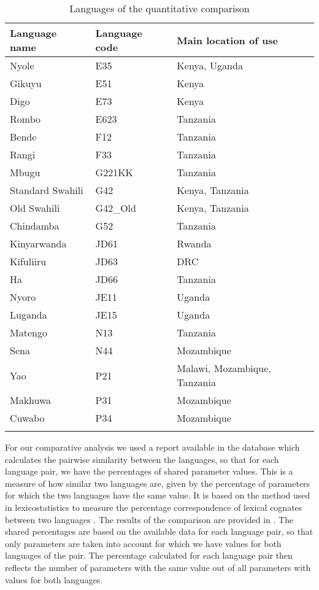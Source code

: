 \documentclass[output=paper]{langscibook}
\begin{document}
\begin{table}
\begin{tabular}{lll}
\lsptoprule
{Language name}  & {Language code}  & {Main location of use}\\
\midrule
Nyole & E35 & Kenya, Uganda\\
Gikuyu & E51 & Kenya\\
Digo & E73 & Kenya\\
Rombo & E623 & Tanzania\\
Bende & F12 & Tanzania\\
Rangi & F33 & Tanzania\\
Mbugu & G221KK & Tanzania\\
Standard Swahili & G42 & Kenya, Tanzania\\
Old Swahili & G42\_Old & Kenya, Tanzania\\
Chindamba & G52 & Tanzania\\
Kinyarwanda & JD61 & Rwanda\\
Kifuliiru & JD63 & DRC\\
Ha & JD66 & Tanzania\\
Nyoro & JE11 & Uganda\\
Luganda & JE15 & Uganda\\
Matengo & N13 & Tanzania\\
Sena & N44 & Mozambique\\
Yao & P21 & Malawi, Mozambique, Tanzania\\
Makhuwa & P31 & Mozambique\\
Cuwabo & P34 & Mozambique\\
\lspbottomrule
\end{tabular}
\caption{\label{tab:marten:6}Languages of the quantitative comparison}
\end{table}

For our comparative analysis we used a report available in the database which calculates the pairwise similarity between the languages, so that for each language pair, we have the percentages of shared parameter values. This is a measure of how similar two languages are, given by the percentage of parameters for which the two languages have the same value. It is based on the method used in lexicostatistics to measure the percentage correspondence of lexical cognates between two languages \citep{Swadesh1952}. The results of the comparison are provided in . The shared percentages are based on the available data for each language pair, so that only parameters are taken into account for which we have values for both languages of the pair. The percentage calculated for each language pair then reflects the number of parameters with the same value out of all parameters with values for both languages.   
\end{document}
